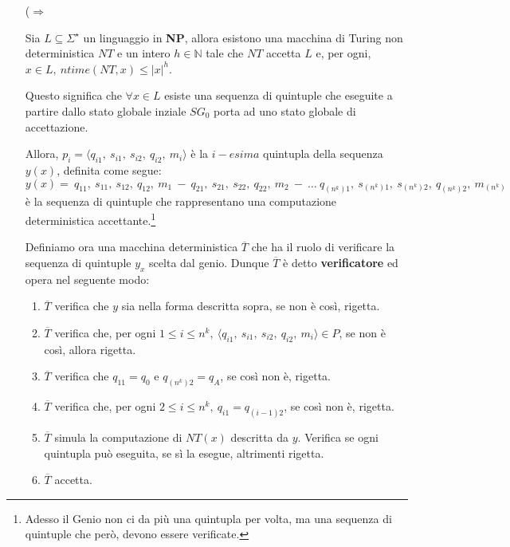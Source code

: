 \begin{itemize}
    \item [($\Rightarrow$]{
        Sia $L \subseteq \Sigma^{\star}$ un linguaggio in \textbf{NP}, allora esistono una macchina di Turing non 
        deterministica $NT$ e un intero $h \in \mathbb{N}$ tale che $NT$ accetta $L$ e, per ogni, $x \in L,\ ntime(NT, x) \leq |x|^h$.
        
        Questo significa che $\forall x \in L$ esiste una sequenza di quintuple che eseguite a partire dallo stato globale inziale $SG_{0}$ 
        porta ad uno stato globale di accettazione. 

        Allora, $p_{i} = \langle q_{i1},\ s_{i1},\ s_{i2},\ q_{i2},\ m_{i} \rangle$ è la $i-esima$ quintupla 
        della sequenza $y(x)$, definita come segue:
        $$y(x) =\ q_{11},\ s_{11},\ s_{12},\ q_{12},\ m_{1}\ -\ q_{21},\ s_{21},\ s_{22},\ q_{22},\ m_{2}\ -\ \dots\ q_{(n^{k})1},\ s_{(n^{k})1},\ s_{(n^{k})2},\ q_{(n^{k})2},\ m_{(n^{k})}$$
        è la sequenza di quintuple che rappresentano una computazione deterministica accettante.\footnote{Adesso il Genio non ci da più una quintupla per volta, ma una sequenza di quintuple che però, devono essere verificate.}

        Definiamo ora una macchina deterministica $\overline{T}$ che ha il ruolo di verificare la sequenza di quintuple $y_{x}$ scelta dal genio. Dunque $\overline{T}$ è 
        detto \textbf{verificatore} ed opera nel seguente modo:
        \begin{enumerate}
            \item $\overline{T}$ verifica che $y$ sia nella forma descritta sopra, se non è così, rigetta.
            \item $\overline{T}$ verifica che, per ogni $1 \leq i \leq n^k,\ \langle q_{i1},\ s_{i1},\ s_{i2},\ q_{i2},\ m_{i} \rangle \in P$, se non è così, allora rigetta.
            \item $\overline{T}$ verifica che $q_{11} = q_{0}$ e $q_{(n^k)2} = q_{A}$, se così non è, rigetta.
            \item $\overline{T}$ verifica che, per ogni $2 \leq i \leq n^k,\ q_{i1} = q_{(i - 1)2}$, se così non è, rigetta.
            \item $\overline{T}$ simula la computazione di $NT(x)$ descritta da $y$. Verifica se ogni quintupla può eseguita, se sì la esegue, altrimenti rigetta.
            \item $\overline{T}$ accetta.
        \end{enumerate}

}
\end{itemize}
